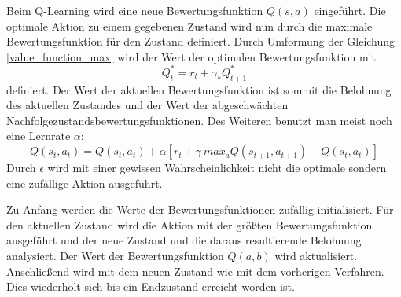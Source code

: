 Beim Q-Learning wird eine neue Bewertungsfunktion $Q(s, a)$ eingeführt. Die optimale Aktion zu einem gegebenen Zustand wird nun durch die maximale Bewertungsfunktion für den Zustand definiert. Durch Umformung der Gleichung \ref{value_function_max} wird der Wert der optimalen Bewertungsfunktion mit
\begin{equation}
	Q^{*}_t = r_t + \gamma_*Q^{*}_{t+1}
\end{equation} 
definiert. Der Wert der aktuellen Bewertungsfunktion ist sommit die Belohnung des aktuellen Zustandes und der Wert der abgeschwächten Nachfolgezustandsbewertungsfunktionen. Des Weiteren benutzt man meist noch eine Lernrate $\alpha$:
\begin{equation}
	Q(s_t, a_t) = Q(s_t, a_t) + \alpha[r_t + \gamma \ max_a Q(s_{t+1}, a_{t+1}) - Q(s_t, a_t)]
\end{equation} \cite{Ertel_2013}
Durch $\epsilon$ wird mit einer gewissen Wahrscheinlichkeit nicht die optimale sondern eine zufällige Aktion ausgeführt.\par
Zu Anfang werden die Werte der Bewertungsfunktionen zufällig initialisiert. Für den aktuellen Zustand wird die Aktion mit der größten Bewertungsfunktion ausgeführt und der neue Zustand und die daraus resultierende Belohnung analysiert. Der Wert der Bewertungsfunktion $Q(a, b)$ wird aktualisiert. Anschließend wird mit dem neuen Zustand wie mit dem vorherigen Verfahren. Dies wiederholt sich bis ein Endzustand erreicht worden ist. \cite{Ertel_2013}


